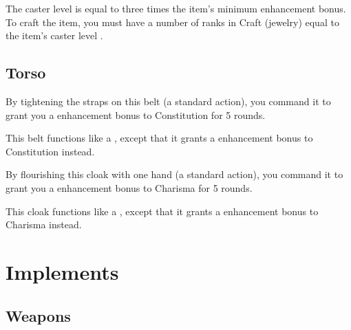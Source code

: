 The caster level is equal to three times the item's minimum enhancement bonus. To craft the item, you must have a number of ranks in Craft (jewelry) equal to the item's caster level .


\subsection{Torso}

 By tightening the straps on this belt (a standard action), you command it to grant you a  enhancement bonus to Constitution for 5 rounds.


 This belt functions like a , except that it grants a  enhancement bonus to Constitution instead.


 By flourishing this cloak with one hand (a standard action), you command it to grant you a  enhancement bonus to Charisma for 5 rounds.


 This cloak functions like a , except that it grants a  enhancement bonus to Charisma instead.


\section{Implements}

\subsection{Weapons}

